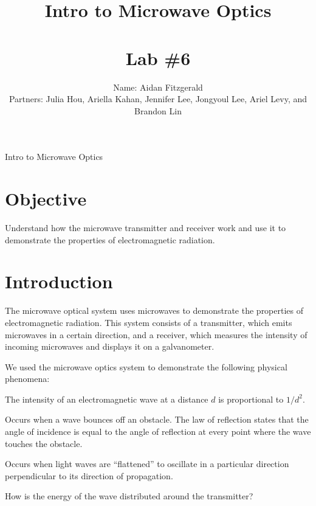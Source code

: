 \documentclass[11pt, titlepage, letterpaper, twoside]{article}
\title{\textbf{Intro to Microwave Optics} \\ \ \\ \large Lab \#6 }
\author{Name: Aidan Fitzgerald \\ Partners: Julia Hou, Ariella Kahan, Jennifer Lee, Jongyoul Lee, Ariel Levy, and Brandon Lin}
\date{}
\begin{document}
\maketitle

\begin{center}
\LARGE Intro to Microwave Optics
\end{center}

\section*{Objective}

Understand how the microwave transmitter and receiver work and use it to demonstrate the properties of electromagnetic radiation.

\section{Introduction}

The microwave optical system uses microwaves to demonstrate the properties of electromagnetic radiation.
This system consists of a transmitter, which emits microwaves in a certain direction, and a receiver,
which measures the intensity of incoming microwaves and displays it on a galvanometer.

We used the microwave optics system to demonstrate the following physical phenomena:

\begin{description}
  \setlength\itemsep{1em}

  \item [Inverse square law] The intensity of an electromagnetic wave at a distance $d$ is proportional to $1/d^2$.

  \item [Reflection] Occurs when a wave bounces off an obstacle. The law of reflection states that the angle of
  incidence is equal to the angle of reflection at every point where the wave touches the obstacle.

  \item [Polarization] Occurs when light waves are ``flattened'' to oscillate in a particular direction perpendicular
  to its direction of propagation.

  \item [Signal distribution] How is the energy of the wave distributed around the transmitter?

\end{description}
\end{document}
